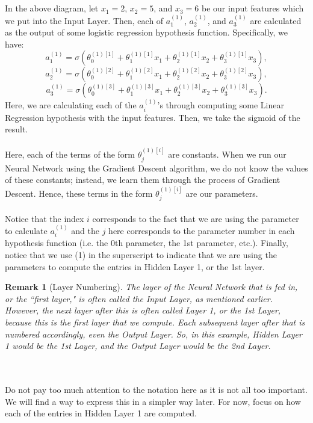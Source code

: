 \documentclass{article}
\newtheorem*{remark}{Remark}
\begin{document}
\\
\\
In the above diagram, let $x_1=2$, $x_2=5$, and $x_3=6$ be our input features which we put into the Input Layer. Then, each of $a_1^{(1)}$, $a_2^{(1)}$, and $a_3^{(1)}$ are calculated as the output of some logistic regression hypothesis function. Specifically, we have:
\[a_1^{(1)}=\sigma(\theta_0^{(1)[1]}+\theta_1^{(1)[1]}x_1+\theta_2^{(1)[1]}x_2+\theta_3^{(1)[1]}x_3),\]
\[a_2^{(1)}=\sigma(\theta_0^{(1)[2]}+\theta_1^{(1)[2]}x_1+\theta_2^{(1)[2]}x_2+\theta_3^{(1)[2]}x_3),\]
\[a_3^{(1)}=\sigma(\theta_0^{(1)[3]}+\theta_1^{(1)[3]}x_1+\theta_2^{(1)[3]}x_2+\theta_3^{(1)[3]}x_3).\]
Here, we are calculating each of the $a^{(1)}_i$'s through computing some Linear Regression hypothesis with the input features. Then, we take the sigmoid of the result. 
\\
\\
Here, each of the terms of the form $\theta^{(1)[i]}_j$ are constants. When we run our Neural Network using the Gradient Descent algorithm, we do not know the values of these constants; instead, we learn them through the process of Gradient Descent. Hence, these terms in the form $\theta^{(1)[i]}_j$ are our parameters. 
\\
\\
Notice that the index $i$ corresponds to the fact that we are using the parameter to calculate $a_i^{(1)}$ and the $j$ here corresponds to the parameter number in each hypothesis function (i.e. the 0th parameter, the 1st parameter, etc.). Finally, notice that we use (1) in the superscript to indicate that we are using the parameters to compute the entries in Hidden Layer 1, or the 1st layer.
\begin{remark}[Layer Numbering]
The layer of the Neural Network that is fed in, or the ``first layer," is often called the Input Layer, as mentioned earlier. However, the next layer after this is often called Layer 1, or the 1st Layer, because this is the first layer that we compute. Each subsequent layer after that is numbered accordingly, even the Output Layer. So, in this example, Hidden Layer 1 would be the 1st Layer, and the Output Layer would be the 2nd Layer. 
\end{remark}
\\
\\
Do not pay too much attention to the notation here as it is not all too important. We will find a way to express this in a simpler way later. For now, focus on how each of the entries in Hidden Layer 1 are computed. 
\\
\end{document}
